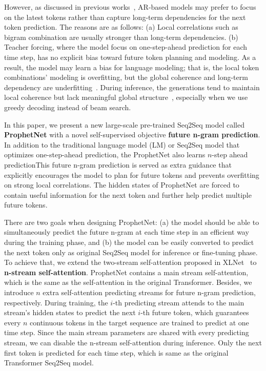 \documentclass[11pt,a4paper]{article}
\begin{document}
However, as discussed in previous works~\cite{pascanu2013difficulty,gulcehre2017plan,serdyuk2017twin}, AR-based models may prefer to focus on the latest tokens rather than capture long-term dependencies for the next token prediction. The reasons are as follows: (a) Local correlations such as bigram combination are usually stronger than long-term dependencies.
(b) Teacher forcing, where the model focus on one-step-ahead prediction for each time step, has no explicit bias toward future token planning and modeling. As a result, the model may learn a bias for language modeling; that is, the local token combinations' modeling is overfitting, but the global coherence and long-term dependency are underfitting~\cite{krueger2016zoneout,merity2017regularizing,serdyuk2017twin}.
During inference, the generations tend to maintain local coherence but lack meaningful global structure~\cite{li2017learning, serdyuk2017twin}, especially when we use greedy decoding instead of beam search.



In this paper, we present a new large-scale pre-trained Seq2Seq model called \textbf{ProphetNet} with a novel self-supervised objective \textbf{future n-gram prediction}.
In addition to the traditional language model (LM) or Seq2Seq model that optimizes one-step-ahead prediction, the ProphetNet also learns $n$-step ahead predictionThis future n-gram prediction is served as extra guidance that explicitly encourages the model to plan for future tokens and prevents overfitting on strong local correlations.
The hidden states of ProphetNet are forced to contain useful information for the next token and further help predict multiple future tokens.

There are two goals when designing ProphetNet: (a) the model should be able to simultaneously predict the future n-gram at each time step in an efficient way during the training phase, and (b) the model can be easily converted to predict the next token only as original Seq2Seq model for inference or fine-tuning phase.
To achieve that, we extend the two-stream self-attention proposed in XLNet~\cite{yang2019xlnet} to \textbf{n-stream self-attention}.
ProphetNet contains a main stream self-attention, which is the same as the self-attention in the original Transformer. 
Besides, we introduce $n$ extra self-attention predicting streams for future n-gram prediction, respectively. 
During training, the $i$-th predicting stream attends to the main stream's hidden states to predict the next $i$-th future token, which guarantees every $n$ continuous tokens in the target sequence are trained to predict at one time step.
Since the main stream parameters are shared with every predicting stream, we can disable the n-stream self-attention during inference. Only the next first token is predicted for each time step, which is same as the original Transformer Seq2Seq model.
\end{document}
